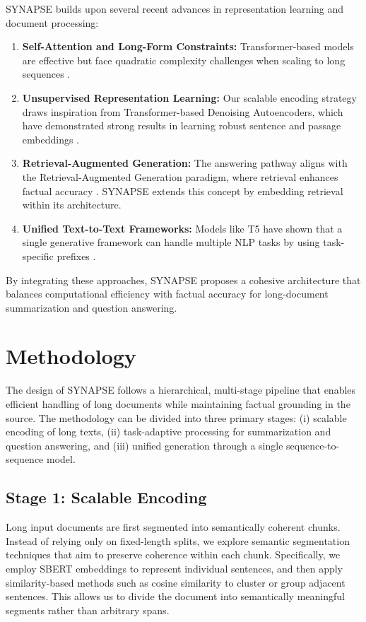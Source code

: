 \documentclass[11pt]{article}
\begin{document}
SYNAPSE builds upon several recent advances in representation learning and document processing:

\begin{enumerate}
    \item \textbf{Self-Attention and Long-Form Constraints:} Transformer-based models are effective but face quadratic complexity challenges when scaling to long sequences \citep{vaswani2023attentionneed}.
    \item \textbf{Unsupervised Representation Learning:} Our scalable encoding strategy draws inspiration from Transformer-based Denoising Autoencoders, which have demonstrated strong results in learning robust sentence and passage embeddings \citep{wang2021tsdaeusingtransformerbasedsequential}.
    \item \textbf{Retrieval-Augmented Generation:} The answering pathway aligns with the Retrieval-Augmented Generation paradigm, where retrieval enhances factual accuracy \citep{lewis2021retrievalaugmentedgenerationknowledgeintensivenlp}. SYNAPSE extends this concept by embedding retrieval within its architecture.
    \item \textbf{Unified Text-to-Text Frameworks:} Models like T5 have shown that a single generative framework can handle multiple NLP tasks by using task-specific prefixes \citep{raffel2023exploringlimitstransferlearning}.
\end{enumerate}

By integrating these approaches, SYNAPSE proposes a cohesive architecture that balances computational efficiency with factual accuracy for long-document summarization and question answering.


\section{Methodology}

The design of SYNAPSE follows a hierarchical, multi-stage pipeline that enables efficient handling of long documents while maintaining factual grounding in the source. The methodology can be divided into three primary stages: (i) scalable encoding of long texts, (ii) task-adaptive processing for summarization and question answering, and (iii) unified generation through a single sequence-to-sequence model.

\subsection{Stage 1: Scalable Encoding}
Long input documents are first segmented into semantically coherent chunks. Instead of relying only on fixed-length splits, we explore semantic segmentation techniques that aim to preserve coherence within each chunk. Specifically, we employ SBERT embeddings \citep{reimers2019sentencebertsentenceembeddingsusing} to represent individual sentences, and then apply similarity-based methods such as cosine similarity to cluster or group adjacent sentences. This allows us to divide the document into semantically meaningful segments rather than arbitrary spans. 
\end{document}
